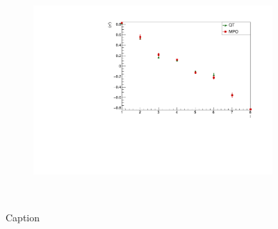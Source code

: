 \begin{figure}
\begin{subfigure}{\columnwidth}
        \label{fig:LMComparison_8sJ1051}
        \end{subfigure}\\
        \begin{subfigure}{\columnwidth}
        \centering
        \includegraphics[scale=0.5]{Figures/LMComparison_8sJ10515.pdf}
        \label{fig:LMComparison_8sJ10515}
        \end{subfigure}\\
    \caption{Caption}
    \label{fig:my_label}
\end{figure}


